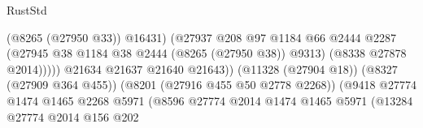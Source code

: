 \begin{lexlean}{RustStd}
\begin{coremodule}
{\begin{coremodule}
{{{{{{{{{{{{{{{{{{{{{{{{{{{{{{{{{{{{{{{{{{{{{{{{{{{{{{                                                            (@8265 (@27950 @33))
                                                            @16431)
                                                          (@27937
                                                            @208
                                                            @97
                                                            @1184
                                                            @66
                                                            @2444
                                                            @2287
                                                            (@27945
                                                              @38
                                                              @1184
                                                              @38
                                                              @2444
                                                              (@8265 (@27950 @38))
                                                              @9313)
                                                            (@8338 @27878 @2014)))))
                                                    @21634
                                                    @21637
                                                    @21640
                                                    @21643))
                                                (@11328 (@27904 @18))
                                                (@8327 (@27909 @364 @455))
                                                (@8201 (@27916 @455 @50 @2778 @2268))
                                                (@9418
                                                  @27774
                                                  @1474
                                                  @1465
                                                  @2268
                                                  @5971
                                                  (@8596
                                                    @27774
                                                    @2014
                                                    @1474
                                                    @1465
                                                    @5971
                                                    (@13284
                                                      @27774
                                                      @2014
                                                      @156
                                                      @202
}}}}}}}}}}}}}}}}}}}}}}}}}}}}}}}}}}}}}}}}}}}}}}}}}}}}}}
\end{coremodule}}
\end{coremodule}
\end{lexlean}
